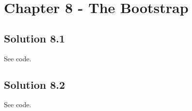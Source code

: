 \section*{Chapter 8 - The Bootstrap}

\subsection*{Solution 8.1}

See code.


\subsection*{Solution 8.2}

See code.
